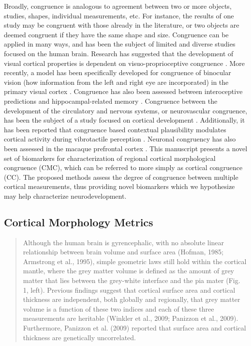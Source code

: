 \documentclass{article}
\begin{document}
Broadly, congruence is analogous to agreement between two or more
objects, studies, shapes, individual measurements, etc. For instance, the
results of one study may be congruent with those already in the literature,
or two objects are deemed congruent if they have the same shape and size.
Congruence can be applied in many ways, and has been the subject of limited
and diverse studies focused on the human brain. Research has suggested that
the development of visual cortical properties is dependent on
visuo-proprioceptive congruence \citep{buisseretChapter22Development1993}.
More recently, a model has been specifically developed for congruence of
binocular vision (how information from the left and right eye are
incorporated) in the primary visual cortex
\citep{somaratnaModelDevelopmentBinocular2022}. Congruence has also been
assessed between interoceptive predictions and hippocampal-related memory
\citep{edwards-duricCongruenceInteroceptivePredictions2020}. Congruence
between the development of the circulatory and nervous systems, or
neurovascular congruence, has been the subject of a study focused on cortical
development \citep{stubbsNeurovascularCongruenceCerebral2009}. Additionally,
it has been reported that congruence based contextual plausibility modulates
cortical activity during vibrotactile perception
\citep{kangCongruencebasedContextualPlausibility2022}. Neuronal congruency
has also been assessed in the macaque prefrontal cortex
\citep{yaoNeuronalCongruencyEffects2022}. This manuscript presents a novel
set of biomarkers for characterization of regional cortical morphological
congruence (CMC), which can be referred to more simply as cortical congruence
(CC). The proposed methods assess the degree of congruence between multiple
cortical measurements, thus providing novel biomarkers which we hypothesize
may help characterize neurodevelopment.

\subsection{Cortical Morphology Metrics}

\citep{winklerCorticalThicknessGrey2010}

\begin{quotation}
Although the human brain is gyrencephalic, with no absolute
linear relationship between brain volume and surface area (Hofman,
1985; Armstrong et al., 1995), simple geometric laws still hold within
the cortical mantle, where the grey matter volume is defined as the
amount of grey matter that lies between the grey-white interface and
the pia mater (Fig. 1, left). Previous findings suggest that cortical
surface area and cortical thickness are independent, both globally and
regionally, that grey matter volume is a function of these two indices
and each of these three measurements are heritable (Winkler et al.,
2009; Panizzon et al., 2009). Furthermore, Panizzon et al. (2009)
reported that surface area and cortical thickness are genetically
uncorrelated.
\end{quotation}
\end{document}
